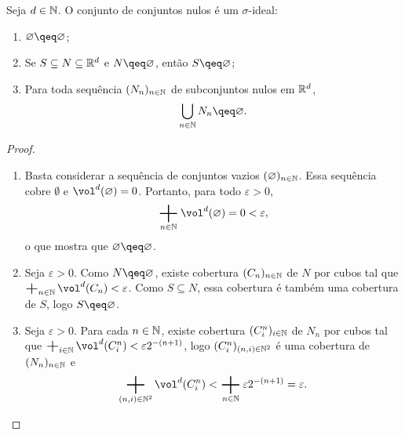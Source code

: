 \begin{prop}
Seja $d \in \mathbb{N}$. O conjunto de conjuntos nulos é um $\sigma$-ideal:
	\begin{enumerate}
	\item $\emptyset \qeq \emptyset$;
	\item Se $S \subseteq N \subseteq \mathbb{R}^d$ e $N \qeq \emptyset$, então $S \qeq \emptyset$;
	\item Para toda sequência $(N_n)_{n \in \mathbb{N}}$ de subconjuntos nulos em $\mathbb{R}^d$,
		\begin{equation*}
		\bigcup_{n \in \N} N_n \qeq \emptyset.
		\end{equation*}
	\end{enumerate}
\end{prop}
\begin{proof}
	\begin{enumerate}
	\item Basta considerar a sequência de conjuntos vazios $(\varnothing)_{n \in \mathbb{N}}$. Essa sequência cobre $\emptyset$ e $\vol^d(\emptyset)=0$. Portanto, para todo $\varepsilon > 0$,
	\begin{equation*}
	\sum_{n \in \N} \vol^d(\emptyset) = 0 < \varepsilon,
	\end{equation*}
o que mostra que $\emptyset \qeq \emptyset$.
	
	\item Seja $\varepsilon > 0$. Como $N \qeq \emptyset$, existe cobertura $(C_n)_{n \in \mathbb{N}}$ de $N$ por cubos tal que $\sum_{n \in \N} \vol^d(C_n) < \varepsilon$. Como $S \subseteq N$, essa cobertura é também uma cobertura de $S$, logo $S \qeq \emptyset$.

	\item Seja $\varepsilon > 0$. Para cada $n \in \mathbb{N}$, existe cobertura $(C^n_i)_{i \in \mathbb{N}}$ de $N_n$ por cubos tal que $\sum_{i \in \N} \vol^d(C^n_i) < \varepsilon2^{-(n+1)}$, logo $(C^n_i)_{(n,i) \in \mathbb{N}^2}$ é uma cobertura de $(N_n)_{n \in \mathbb{N}}$ e
		\begin{equation*}
		\sum_{(n,i) \in \N^2} \vol^d(C^n_{i}) < \sum_{n \in \N} \varepsilon2^{-(n+1)} = \varepsilon. \qedhere
		\end{equation*}
	\end{enumerate}
\end{proof}

